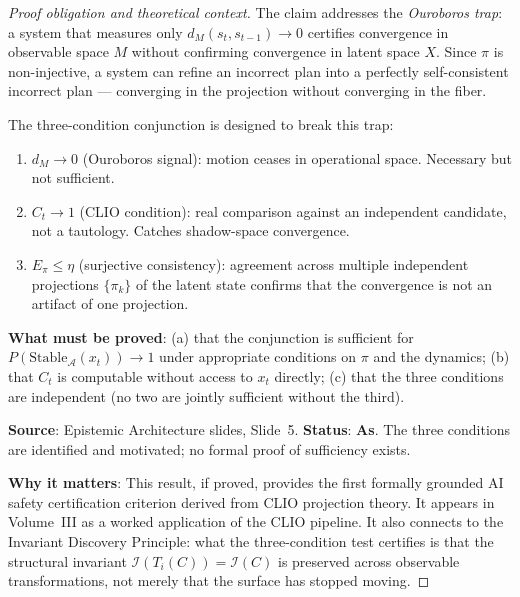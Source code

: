 \documentclass[11pt, a4paper]{book}
\theoremstyle{flyxion}
\theoremstyle{remark}
\begin{document}
\begin{proof}[Proof obligation and theoretical context]
The claim addresses the \emph{Ouroboros trap}: a system that
measures only $d_M(s_t, s_{t-1}) \to 0$ certifies convergence
in observable space $M$ without confirming convergence in latent
space $X$. Since $\pi$ is non-injective, a system can refine an
incorrect plan into a perfectly self-consistent incorrect plan ---
converging in the projection without converging in the fiber.

The three-condition conjunction is designed to break this trap:
\begin{enumerate}
\item $d_M \to 0$ (Ouroboros signal): motion ceases in operational
  space. Necessary but not sufficient.
\item $C_t \to 1$ (CLIO condition): real comparison against an
  independent candidate, not a tautology. Catches shadow-space
  convergence.
\item $E_\pi \leq \eta$ (surjective consistency): agreement across
  multiple independent projections $\{\pi_k\}$ of the latent state
  confirms that the convergence is not an artifact of one projection.
\end{enumerate}

\textbf{What must be proved}: (a) that the conjunction is sufficient
for $P(\mathrm{Stable}_\mathcal{A}(x_t)) \to 1$ under appropriate
conditions on $\pi$ and the dynamics; (b) that $C_t$ is computable
without access to $x_t$ directly; (c) that the three conditions are
independent (no two are jointly sufficient without the third).

\textbf{Source}: Epistemic Architecture slides, Slide~5.
\textbf{Status}: \textbf{As}. The three conditions are identified
and motivated; no formal proof of sufficiency exists.

\textbf{Why it matters}: This result, if proved, provides the first
formally grounded AI safety certification criterion derived from
CLIO projection theory. It appears in Volume~III as a worked
application of the CLIO pipeline. It also connects to the Invariant
Discovery Principle: what the three-condition test certifies is
that the structural invariant $\mathcal{I}(T_i(C)) = \mathcal{I}(C)$
is preserved across observable transformations, not merely that
the surface has stopped moving.
\end{proof}
\end{document}
